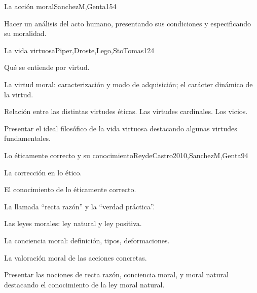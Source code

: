 \begin{syllabus}
\begin{unit}{La acción moral}{SanchezM,Genta}{15}{4}
\begin{topics}
\end{topics}
\begin{learningoutcomes}
	\item Hacer un análisis del acto humano, presentando sus condiciones y especificando su moralidad.
\end{learningoutcomes}
\end{unit}

\begin{unit}{La vida virtuosa}{Piper,Droste,Lego,StoTomas}{12}{4}
\begin{topics}
	\item	Qué se entiende por virtud.
	\item	La virtud moral: caracterización y modo de adquisición; el carácter dinámico de la virtud.
	\item	Relación entre las distintas virtudes éticas. Las virtudes cardinales. Los vicios.

\end{topics}
\begin{learningoutcomes}
	\item Presentar el ideal filosófico de la vida virtuosa destacando algunas virtudes fundamentales.
\end{learningoutcomes}
\end{unit}

\begin{unit}{Lo éticamente correcto y su conocimiento}{ReydeCastro2010,SanchezM,Genta}{9}{4}
\begin{topics}
	\item 	La corrección en lo ético.
	\item 	El conocimiento de lo éticamente correcto.
	\item 	La llamada ``recta razón'' y la ``verdad práctica''. 
	\item 	Las leyes morales: ley natural y ley positiva.
	\item 	La conciencia moral: definición, tipos, deformaciones. 
	\item 	La valoración moral de las acciones concretas.

\end{topics}

\begin{learningoutcomes}
	\item Presentar las nociones de recta razón, conciencia moral, y moral natural destacando el conocimiento de la ley moral natural.
\end{learningoutcomes}
\end{unit}



\begin{coursebibliography}
\end{coursebibliography}

\end{syllabus}
